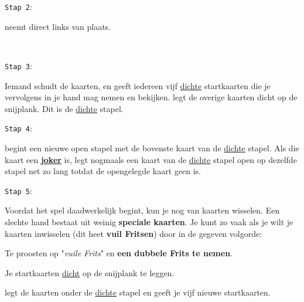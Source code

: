 \noindent
\begin{minipage}[t]{.09\textwidth}
\texttt{Stap 2}:
\end{minipage}
\hfill
\begin{minipage}[t]{.91\textwidth}
\Willem neemt direct links van \Frits plaats. 
\end{minipage}
\\

\noindent
\begin{minipage}[t]{.09\textwidth}
\texttt{Stap 3}:
\end{minipage}
\hfill
\begin{minipage}[t]{.91\textwidth}
Iemand schudt de kaarten, en \Frits geeft iedereen vijf \ul{dichte} startkaarten die je vervolgens in je hand mag nemen en bekijken. \Frits legt de overige kaarten dicht op de snijplank. Dit is de \ul{dichte} stapel. \\
\end{minipage}

\noindent
\begin{minipage}[t]{.09\textwidth}
\texttt{Stap 4}:
\end{minipage}
\hfill
\begin{minipage}[t]{.91\textwidth}
\Frits begint een nieuwe open stapel met de bovenste kaart van de \ul{dichte} stapel. Als die kaart een \textbf{\ul{joker}} is, legt \Frits nogmaals een kaart van de \ul{dichte} stapel open op dezelfde stapel net zo lang totdat de opengelegde kaart geen  is.
\end{minipage}

\vspace*{+0.35cm} 

\noindent
\begin{minipage}[t]{.09\textwidth}
\texttt{Stap 5}:
\end{minipage}
\hfill
\begin{minipage}[t]{.91\textwidth}
Voordat het spel daadwerkelijk begint, kun je nog van kaarten wisselen. Een slechte hand bestaat uit weinig \textbf{speciale kaarten}. Je kunt zo vaak als je wilt je kaarten inwisselen (dit heet \textbf{vuil Fritsen}) door in de gegeven volgorde:
\numeriekeLijst{}
    \item Te proosten op "\textit{vuile Frits}" en \textbf{een dubbele Frits te nemen}.
    \item Je startkaarten \ul{dicht} op de snijplank te leggen.
    \item \Frits legt de kaarten onder de \ul{dichte} stapel en geeft je vijf nieuwe startkaarten.
\eindNumeriekeLijst{}
\end{minipage}
\vspace*{+0.3cm} 
    

